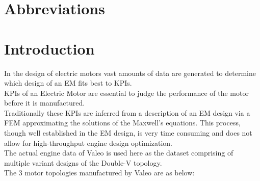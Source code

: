 \documentclass{report} %
\begin{document}
\newpage

\newpage

\chapter*{Abbreviations}
\begin{acronym}[TDMA]
  

\end{acronym}

\newpage

\newpage

\chapter*{Introduction} 
In the design of electric motors vast amounts of data are generated to determine which design of an EM fits best to KPIs. \\
KPIs of an Electric Motor are essential to judge the performance of the motor before it is manufactured. \\
Traditionally these KPIs are inferred from a description of an EM design via a FEM approximating the solutions of the Maxwell’s equations. This process, though well established in the EM design, is very time consuming and does not allow for high-throughput engine design optimization. \\
The actual engine data of Valeo is used here as the dataset comprising of multiple variant designs of the Double-V topology.\\
The 3 motor topologies manufactured by Valeo are as below:
\end{document}
